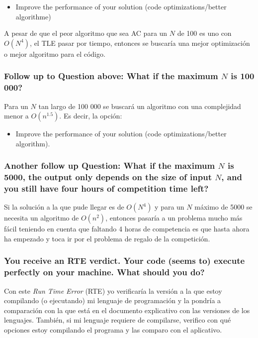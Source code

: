 \documentclass{article}
\begin{document}
\begin{itemize}
  \item Improve the performance of your solution (code optimizations/better algorithme)
\end{itemize}

A pesar de que el peor algoritmo que sea AC para un $N$ de 100 es uno con $O(N^{4})$, el TLE pasar por tiempo, entonces se buscaría una mejor optimización o mejor algoritmo para el código.


\subsubsection{Follow up to Question above: What if the maximum $N$ is 100 000?}


Para un $N$ tan largo de 100 000 se buscará un algoritmo con una complejidad menor a $O(n^{1.5})$. Es decir, la opción:

\begin{itemize}
  \item Improve the performance of your solution (code optimizations/better algorithm).
\end{itemize}


\subsubsection{Another follow up Question: What if the maximum $N$ is 5000, the output only depends on the size of input $N$, and you still have four hours of competition time left?}


Si la solución a la que pude llegar es de $O(N^{4})$ y para un $N$ máximo de 5000 se necesita un algoritmo de $O(n^{2})$, entonces pasaría a un problema mucho más fácil teniendo en cuenta que faltando 4 horas de competencia es que hasta ahora ha empezado y toca ir por el problema de regalo de la competición.


\subsubsection{You receive an RTE verdict. Your code (seems to) execute perfectly on your machine. What should you do?}


Con este \textit{Run Time Error} (RTE) yo verificaría la versión a la que estoy compilando (o ejecutando) mi lenguaje de programación y la pondría a comparación con la que está en el documento explicativo con las versiones de los lenguajes. También, si mi lenguaje requiere de compilarse, verifico con qué opciones estoy compilando el programa y las comparo con el aplicativo.
\end{document}
